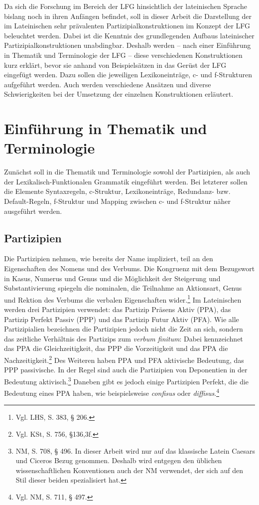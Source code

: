 \documentclass[12pt,a4paper]{article}
\begin{document}
Da sich die Forschung im Bereich der LFG hinsichtlich der lateinischen Sprache bislang noch in ihren Anfängen befindet, soll in dieser Arbeit die Darstellung der im Lateinischen sehr prävalenten Partizipialkonstruktionen im Konzept der LFG beleuchtet werden. Dabei ist die Kenntnis des grundlegenden Aufbaus lateinischer Partizipialkonstruktionen unabdingbar. Deshalb werden -- nach einer Einführung in Thematik und Terminologie der LFG -- diese verschiedenen Konstruktionen kurz erklärt, bevor sie anhand von Beispielsätzen in das Gerüst der LFG eingefügt werden. Dazu sollen die jeweiligen Lexikoneinträge, c- und f-Strukturen aufgeführt werden. Auch werden verschiedene Ansätzen und diverse Schwierigkeiten bei der Umsetzung der einzelnen Konstruktionen erläutert. 

\section{Einführung in Thematik und Terminologie}
Zunächst soll in die Thematik und Terminologie sowohl der Partizipien, als auch der Lexikalisch-Funktionalen Grammatik eingeführt werden. Bei letzterer sollen die Elemente  Syntaxregeln, c-Struktur, Lexikoneinträge, Redundanz- bzw. Default-Regeln, f-Struktur und Mapping zwischen c- und f-Struktur näher ausgeführt werden.

\subsection{Partizipien}
Die Partizipien nehmen, wie bereits der Name impliziert, teil an den Eigenschaften des Nomens und des Verbums. Die Kongruenz mit dem Bezugswort in Kasus, Numerus und Genus und die Möglichkeit der Steigerung und Substantivierung spiegeln die nominalen, die Teilnahme an Aktionsart, Genus und Rektion des Verbums die verbalen Eigenschaften wider.\footnote{Vgl. LHS, S. 383, § 206.}
Im Lateinischen werden drei Partizipien verwendet: das Partizip Präsens Aktiv (PPA), das Partizip Perfekt Passiv (PPP) und das Partizip Futur Aktiv (PFA).
Wie alle Partizipialien bezeichnen die Partizipien jedoch nicht die Zeit an sich, sondern das zeitliche Verhältnis des Partizips zum \textit{verbum finitum}: Dabei kennzeichnet das PPA die Gleichzeitigkeit, das PPP die Vorzeitigkeit und das PPA die Nachzeitigkeit.\footnote{Vgl. KSt, S. 756, §136,3f.}
Des Weiteren haben PPA und PFA aktivische Bedeutung, das PPP passivische. In der Regel sind auch die Partizipien von Deponentien in der Bedeutung aktivisch.\footnote{NM, S. 708, § 496. In dieser Arbeit wird nur auf das klassische Latein Caesars und Ciceros Bezug genommen. Deshalb wird entgegen den üblichen wissenschaftlichen Konventionen auch der NM verwendet, der sich auf den Stil dieser beiden spezialisiert hat.} Daneben gibt es jedoch einige Partizipien Perfekt, die die Bedeutung eines PPA haben, wie beispielsweise \textit{confisus} oder \textit{diffisus}.\footnote{Vgl. NM, S. 711, § 497.}
\end{document}
